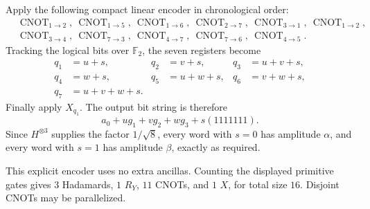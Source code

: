 \documentclass[11pt]{article}
\newcommand{\CNOT}[2]{\operatorname{CNOT}_{#1\to #2}}
\begin{document}
Apply the following compact linear encoder in chronological order:
\[
\begin{aligned}
&\CNOT{1}{2},\
\CNOT{1}{5},\
\CNOT{1}{6},\
\CNOT{2}{7},\
\CNOT{3}{1},\
\CNOT{1}{2},\\
&\CNOT{3}{4},\
\CNOT{7}{3},\
\CNOT{4}{7},\
\CNOT{7}{6},\
\CNOT{4}{5}.
\end{aligned}
\]
Tracking the logical bits over \(\mathbb F_2\), the seven registers become
\[
\begin{aligned}
q_1&=u+s,&q_2&=v+s,&q_3&=u+v+s,\\
q_4&=w+s,&q_5&=u+w+s,&q_6&=v+w+s,\\
q_7&=u+v+w+s.&&&
\end{aligned}
\]
Finally apply \(X_{q_1}\). The output bit string is therefore
\[
 a_0+ug_1+vg_2+wg_3+s(1111111).
\]
Since \(H^{\otimes3}\) supplies the factor \(1/\sqrt8\), every word with
\(s=0\) has amplitude \(\alpha\), and every word with \(s=1\) has
amplitude \(\beta\), exactly as required.

This explicit encoder uses no extra ancillas. Counting the displayed
primitive gates gives \(3\) Hadamards, \(1\) \(R_Y\), \(11\) CNOTs, and
\(1\) \(X\), for total size \(16\). Disjoint CNOTs may be parallelized.
\end{document}
